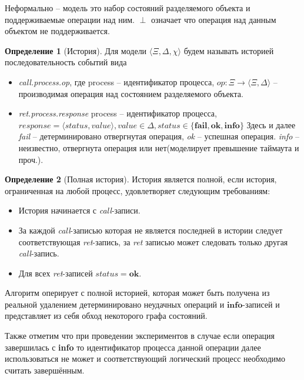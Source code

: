 \documentclass[pdftex,ptm,14pt,a4paper]{extreport}
\theoremstyle{definition}
\newtheorem{definition}{Определение}[chapter]
\begin{document}
Неформально -- модель это набор состояний разделяемого объекта и поддерживаемые операции над ним.
$\perp$ означает что операция над данным объектом не поддерживается.

\begin{definition}[История]
    Для модели $\langle \Xi, \Delta, \chi \rangle$ будем называть историей последовательность событий вида
    \begin{itemize}
        \item \textit{call.process.op}, где process --  идентификатор процесса,
             $\textit{op}: \Xi \rightarrow \langle \Xi, \Delta \rangle$  -- производимая операция над состоянием разделяемого объекта.
        \item \textit{ret.process.response} process -- идентификатор процесса,
            $\textit{response} = \langle \textit{status}, \textit{value} \rangle,
            \textit{value} \in \Delta,
            \textit{status} \in \{\textbf{fail},\textbf{ok},\textbf{info}\}$
            Здесь и далее
        \subitem \textit{fail} -- детерминировано отвергнутая операция,
        \subitem \textit{ok} -- успешная операция.
        \subitem \textit{info} -- неизвестно, отвергнута операция или нет(моделирует превышение таймаута и проч.).
    \end{itemize}
\end{definition}

\begin{definition}[Полная история]
    История является полной, если история, ограниченная на любой процесс, удовлетворяет следующим требованиям:
    \begin{itemize}
        \item История начинается с \textit{call}-записи.
        \item За каждой \textit{call}-записью которая не является последней в истории
            следует соответствующая \textit{ret}-запись,
            за \textit{ret} записью может следовать только другая \textit{call}-запись.
        \item Для всех \textit{ret}-записей $\textit{status} = \textbf{ok}.$
    \end{itemize}
\end{definition}

Алгоритм оперирует с полной историей, которая может быть получена из реальной удалением
детерминировано неудачных операций и $\textbf{info}$-записей и представляет из себя обход некоторого графа состояний.

Также отметим что при проведении экспериментов в случае если операция завершилась с \textbf{info}
то идентификатор процесса данной операции далее использоваться не может и соответствующий
логический процесс необходимо считать завершённым.
\end{document}
